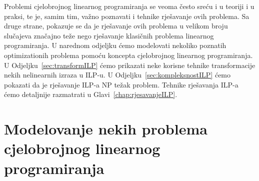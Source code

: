 \documentclass[a4paper, utf8, 11pt, colorlinks]{book}
\theoremstyle{definition}
\begin{document}
Problemi cjelobrojnog linearnog programiranja se veoma često sreću i u teoriji i u praksi, te je, samim tim, važno poznavati i tehnike rješavanje ovih problema. Sa druge strane, pokazuje se da je rješavanje ovih problema u velikom broju slučajeva značajno teže nego rješavanje klasičnih problema linearnog programiranja. U narednom odjeljku ćemo modelovati nekoliko poznatih optimizationih problema pomoću koncepta cjelobrojnog linearnog programiranja. U Odjeljku~\ref{sec:transformILP} ćemo prikazati neke korisne tehnike transformacije nekih nelinearnih izraza u ILP-u. U Odjeljku~\ref{sec:kompleksnostILP} ćemo pokazati da je rješavanje ILP-a NP težak problem. Tehnike rješavanja ILP-a ćemo detaljnije razmatrati u Glavi~\ref{chap:rjesavanjeILP}.
\section{Modelovanje nekih problema cjelobrojnog linearnog programiranja}
\end{document}
